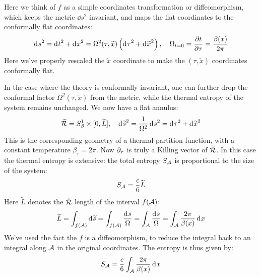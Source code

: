 \documentclass[11pt,a4paper,utf8]{article}
\renewcommand{\tilde}[1]{\ensuremath{\widetilde{#1}}}
\begin{document}
	Here we think of $f$ as a simple coordinates transformation or diffeomorphism, which keeps the metric $\dd{s}^2$ invariant, and maps the flat coordinates to the conformally flat coordinates:
	\begin{equation}
		\dd{s}^2
		= \dd{t}^2 + \dd{x}^2
		= \Omega^2(\tau,\tilde{x}) \pqty{
				\dd{\tau}^2 + \dd{\tilde{x}}^2
			},
	\quad
		\Omega_{t = 0} = \pdv{t}{\tau}
		= \frac{\beta(x)}{2\pi}
	\end{equation}
	Here we've properly rescaled the $\tilde{x}$ coordinate to make the $(\tau,\tilde{x})$ coordinates conformally flat. 
	
	In the case where the theory is conformally invariant, one can further drop the conformal factor $\Omega^2(\tau,\tilde{x})$ from the metric, while the thermal entropy of the system remains unchanged. We now have a flat annulus:
	\begin{equation}
		\tilde{\mcal{R}}
		= S^1_\beta \times [0,\tilde{L}],
	\quad
		\dd{\tilde{s}}^2
		= \frac{1}{\Omega^2} \dd{s}^2
		= \dd{\tau}^2 + \dd{\tilde{x}}^2
	\end{equation}
	This is the corresponding geometry of a thermal partition function, with a constant temperature $\beta_\tau = 2\pi$. 
	Now $\partial_{\tau}$ is truly a Killing vector of $\tilde{\mcal{R}}$. 
	In this case the thermal entropy is extensive: the total entropy $S_{\mathcal{A}}$ is proportional to the size of the system:
	\begin{equation}
		S_\mcal{A}
		= \frac{c}{6} \tilde{L}
	\end{equation}
	Here $\tilde{L}$ denotes the $\tilde{\mcal{R}}$ length of the interval $f(\mathcal{A})$:
	\begin{equation}
		\tilde{L}
		= \int_{f(\mcal{A})} \dd{\tilde{s}}
		= \int_{f(\mcal{A})} \frac{\dd{s}}{\Omega}
		= \int_{\mcal{A}} \frac{\dd{s}}{\Omega}
		= \int_{\mcal{A}} \frac{2\pi}{\beta(x)} \dd{x}
	\end{equation}
	We've used the fact the $f$ is a diffeomorphism, to reduce the integral back to an integral along $\mathcal{A}$ in the original coordinates. 
	The entropy is thus given by:
	\begin{equation}
		S_{\mathcal{A}}
		= \frac{c}{6}
			\int_{\mathcal{A}} \frac{2\pi}{\beta(x)} \mathinner{\mathrm{d}^{}x}
	\end{equation}
	
\end{document}
